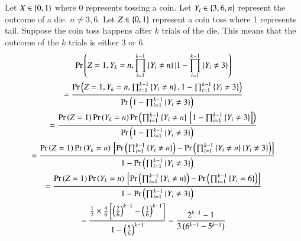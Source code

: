 Let $X \in \left\{0,1\right\}$ where 0 represents tossing a coin.  Let $ Y_i \in \left\{3,6,n\right\}$ represent the outcome of a die. $n \ne 3,6$.  Let $Z \in \left\{0,1\right\}$ represent a coin toss where 1 represents tail.  Suppose the coin toss happens after $k$ trials of the die.  This means that the outcome of the $k$ trials is either 3 or 6.
{\tiny
\begin{multline}
\Pr\left(Z = 1,Y_k=n,\prod_{i=1}^{k-1}\left\{Y_i \ne n\right\}|1-\prod_{i=1}^{k-1}\left\{Y_i \ne 3\right\}\right)
\\
=\frac{\Pr\left(Z = 1,Y_k=n,\prod_{i=1}^{k-1}\left\{Y_i \ne n\right\},1-\prod_{i=1}^{k-1}\left\{Y_i \ne 3\right\}\right)}{\Pr\left(1-\prod_{i=1}^{k-1}\left\{Y_i \ne 3\right\}\right)}
\\
=\frac{\Pr\left(Z = 1\right)\Pr\left(Y_k=n\right)\Pr\left(\prod_{i=1}^{k-1}\left\{Y_i \ne n\right\}{}\left[1-\prod_{i=1}^{k-1}\left\{Y_i \ne 3\right\}\right]\right)}{\Pr\left(1-\prod_{i=1}^{k-1}\left\{Y_i \ne 3\right\}\right)}
\\
=\frac{\Pr\left(Z = 1\right)\Pr\left(Y_k=n\right){}\left[\Pr\left(\prod_{i=1}^{k-1}\left\{Y_i \ne n\right\}\right)-\Pr\left(\prod_{i=1}^{k-1}\left\{Y_i \ne n\right\}\left\{Y_i \ne 3\right\}\right)\right]}{1-\Pr\left(\prod_{i=1}^{k-1}\left\{Y_i \ne 3\right\}\right)}
\\
=\frac{\Pr\left(Z = 1\right)\Pr\left(Y_k=n\right){}\left[\Pr\left(\prod_{i=1}^{k-1}\left\{Y_i \ne n\right\}\right)-\Pr\left(\prod_{i=1}^{k-1}\left\{Y_i =6 \right\}\right)\right]}{1-\Pr\left(\prod_{i=1}^{k-1}\left\{Y_i \ne 3\right\}\right)}
\\
=\frac{\frac{1}{2}\times \frac{4}{6}{}\left[\left(\frac{2}{6}\right)^{k-1}-\left(\frac{1}{6}\right)^{k-1}\right]}{1-\left(\frac{5}{6}\right)^{k-1}}
= \frac{2^{k-1}-1}{3\left(6^{k-1}-5^{k-1}\right)}
\end{multline}
}

